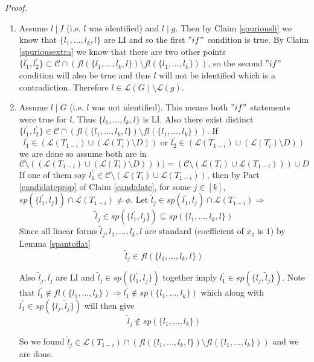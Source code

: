 \documentclass[letterpaper,USenglish,numberwithinsect]{lipics}
\newcommand{\ML}{\mathcal{L}}
\newcommand{\MC}{\mathcal{C}}
\begin{document}
\emph{Proof.}
\begin{enumerate}

\item Assume $l\mid I$ (i.e. $l$ was identified) and $l\mid g$. Then by Claim
\ref{spuriousli} we know that $\{l_{1},\ldots,l_{k},l\}$ are LI and so the
first $"if"$ condition is true. By Claim \ref{spuriousextra} we know that there are two
other points $\{l_1^\prime,l_2^\prime\} \subset \MC \cap (fl(\{l_{1},\ldots,l_{k},l\})\setminus fl(\{l_{1},\ldots,l_{k}\}))$, so the second
$"if"$ condition will also be true and thus $l$ will not be identified which is a
contradiction. Therefore $l\in \ML(G)\setminus\ML(g)$.
\item Assume $l\mid G$ (i.e. $l$ was not identified). This means both $"if"$ statements were
true for $l$. Thus $\{l_{1},\ldots,l_{k},l\}$
is LI. Also there exist distinct $\{l_1^\prime, l_2^\prime\} \in \MC \cap (fl(\{l_{1},\ldots,l_{k},l\})\setminus
fl(\{l_{1},\ldots,l_{k}\}))$. If
\[
l_1^\prime \in (\ML(T_{1-i})\cup (\ML(T_i)\setminus D)) \text{ or }
l_2^\prime  \in (\ML(T_{1-i})\cup (\ML(T_i)\setminus D))
 \]
 we are done so assume both are in
 \[
 \MC\setminus((\ML(T_{1-i})\cup (\ML(T_i)\setminus D)))) = (\MC\setminus
(\ML(T_i)\cup \ML(T_{1-i})))\cup D
 \]
 If one of them say $l_1^\prime \in \MC\setminus(\ML(T_i)\cup \ML(T_{1-i}))$, then by
Part \ref{candidateprop} of Claim \ref{candidate}, for some $j\in [k]$,  $
sp(\{l_1^\prime,l_{j}\})\cap \ML(T_{1-i}) \neq \phi$. Let $\tilde l_{j}\in
sp(l_1^\prime,l_{j})\cap \ML(T_{1-i}) \Rightarrow$
 \[
\tilde l_{j}\in sp(\{l_1^\prime ,l_{j}\})\subseteq sp(\{l_{1},\ldots,l_{k},l\})
 \]
 Since all linear forms $\tilde l_j,l_1,\ldots,l_k,l$ are standard (coefficient of $x_1$ is $1$) by Lemma \ref{spantoflat}
 \[
  \tilde l_j \in fl(\{l_{1},\ldots,l_{k},l\})
 \]


 Also $\tilde l_{j},l_{j}$ are LI and $\tilde l_{j}\in sp(\{l_1^\prime ,l_{j}\})$ together imply $l_1^\prime\in sp(\{l_{j},\tilde l_{j}\})$.
 Note that $l_1^\prime \notin fl(\{l_{1},\ldots,l_{k}\})\Rightarrow l_1^\prime\notin sp(\{l_{1},\ldots,l_{k}\})$ which along with
 $l_1^\prime\in sp(\{l_{j},\tilde l_{j}\})$ will then give
  \[
  \tilde l_{j}\notin sp(\{l_{1},\ldots,l_{k}\})
  \]

  So we found $\tilde l_{j}\in \ML(T_{1-i})\cap
(fl(\{l_{1},\ldots,l_{k},l\})\setminus fl(\{l_{1},\ldots,l_{k}\})) $ and we
are done.\\


\end{enumerate}
\end{document}

